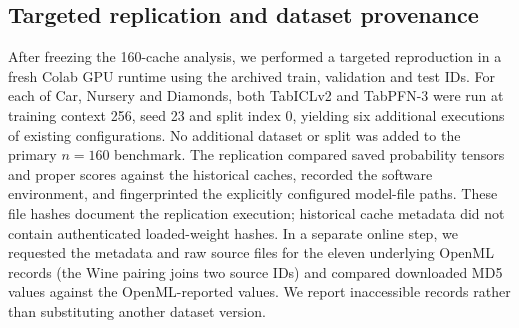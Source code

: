 \documentclass[a4paper,fleqn]{cas-sc}
\begin{document}
\begin{table}[t]
\centering
\caption{Two real-model experimental protocols retained as separate evidence streams. The second protocol isolates changes in training context at fixed validation/test IDs; its four randomized split settings are not independent datasets.}
\label{tab:protocols}
\end{table}

\subsection{Targeted replication and dataset provenance}
After freezing the 160-cache analysis, we performed a targeted reproduction in a fresh Colab GPU runtime using the archived train, validation and test IDs. For each of Car, Nursery and Diamonds, both TabICLv2 and TabPFN-3 were run at training context 256, seed 23 and split index 0, yielding six additional executions of existing configurations. No additional dataset or split was added to the primary $n=160$ benchmark. The replication compared saved probability tensors and proper scores against the historical caches, recorded the software environment, and fingerprinted the explicitly configured model-file paths. These file hashes document the replication execution; historical cache metadata did not contain authenticated loaded-weight hashes. In a separate online step, we requested the metadata and raw source files for the eleven underlying OpenML records (the Wine pairing joins two source IDs) and compared downloaded MD5 values against the OpenML-reported values. We report inaccessible records rather than substituting another dataset version.
\end{document}
